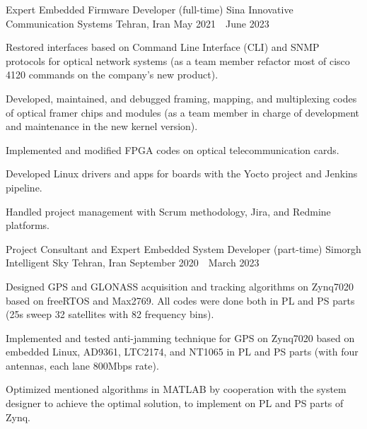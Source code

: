 \begin{cventries}
  \cventry
    {Expert Embedded Firmware Developer (full-time)} %
    {Sina Innovative Communication Systems} %
    {Tehran, Iran} %
    {May 2021~\textendash~June 2023} %
    {
      \begin{cvitems} %
        \item {Restored interfaces based on Command Line Interface (CLI) and SNMP protocols for optical network systems (as a team member refactor most of cisco 4120 commands on the company's new product).}
	      \item {Developed, maintained, and debugged framing, mapping, and multiplexing codes of optical framer chips and modules (as a team member in charge of development and maintenance in the new kernel version).}
        \item {Implemented and modified FPGA codes on optical telecommunication cards.}
	      \item {Developed Linux drivers and apps for boards with the Yocto project and Jenkins pipeline.}
	      \item {Handled project management with Scrum methodology, Jira, and Redmine platforms.}
      \end{cvitems}
    }

  \cventry
    {Project Consultant and Expert Embedded System Developer (part-time)} %
    {Simorgh Intelligent Sky} %
    {Tehran, Iran} %
    {September 2020~\textendash~March 2023} %
    {
      \begin{cvitems} %
        \item {Designed GPS and GLONASS acquisition and tracking algorithms on Zynq7020 based on freeRTOS and Max2769. All codes were done both in PL and PS parts (25s sweep 32 satellites with 82 frequency bins).}
        \item {Implemented and tested anti-jamming technique for GPS on Zynq7020 based on embedded Linux, AD9361, LTC2174, and NT1065 in PL and PS parts (with four antennas, each lane 800Mbps rate).}
	      \item {Optimized mentioned algorithms in MATLAB by cooperation with the system designer to achieve the optimal solution, to implement on PL and PS parts of Zynq.}
      \end{cvitems}
    }


\end{cventries}

